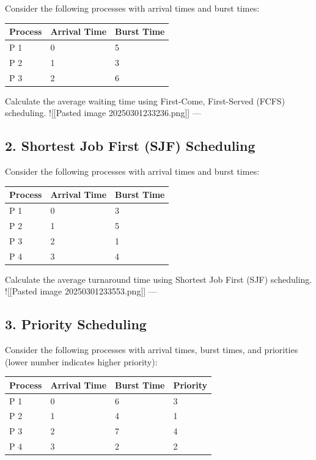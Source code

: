 Consider the following processes with arrival times and burst times:

\begin{longtable}[]{@{}lll@{}}
\toprule\noalign{}
Process & Arrival Time & Burst Time \\
\midrule\noalign{}
\endhead
\bottomrule\noalign{}
\endlastfoot
P 1 & 0 & 5 \\
P 2 & 1 & 3 \\
P 3 & 2 & 6 \\
\end{longtable}

Calculate the average waiting time using First-Come, First-Served (FCFS)
scheduling. !{[}{[}Pasted image 20250301233236.png{]}{]} ---

\subsection{2. Shortest Job First (SJF)
Scheduling}\label{shortest-job-first-sjf-scheduling}

Consider the following processes with arrival times and burst times:

\begin{longtable}[]{@{}lll@{}}
\toprule\noalign{}
Process & Arrival Time & Burst Time \\
\midrule\noalign{}
\endhead
\bottomrule\noalign{}
\endlastfoot
P 1 & 0 & 3 \\
P 2 & 1 & 5 \\
P 3 & 2 & 1 \\
P 4 & 3 & 4 \\
\end{longtable}

Calculate the average turnaround time using Shortest Job First (SJF)
scheduling. !{[}{[}Pasted image 20250301233553.png{]}{]} ---

\subsection{3. Priority Scheduling}\label{priority-scheduling}

Consider the following processes with arrival times, burst times, and
priorities (lower number indicates higher priority):

\begin{longtable}[]{@{}llll@{}}
\toprule\noalign{}
Process & Arrival Time & Burst Time & Priority \\
\midrule\noalign{}
\endhead
\bottomrule\noalign{}
\endlastfoot
P 1 & 0 & 6 & 3 \\
P 2 & 1 & 4 & 1 \\
P 3 & 2 & 7 & 4 \\
P 4 & 3 & 2 & 2 \\
\end{longtable}

